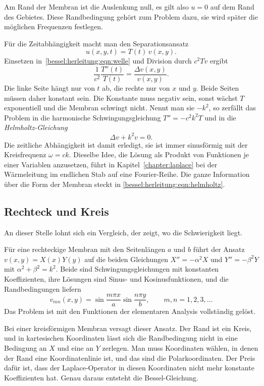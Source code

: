 Am Rand der Membran ist die Auslenkung null, es gilt also $u=0$ auf dem Rand des Gebietes.
Diese Randbedingung gehört zum Problem dazu, sie wird später die möglichen Frequenzen festlegen.

Für die Zeitabhängigkeit macht man den Separationsansatz
%
\begin{equation}
u(x,y,t)
=
T(t)\, v(x,y).
\label{bessel:herleitung:eqn:zeitsep}
\end{equation}
Einsetzen in~\eqref{bessel:herleitung:eqn:welle} und Division durch
$c^2Tv$ ergibt
\[
\frac{1}{c^2}\frac{T''(t)}{T(t)}
=
\frac{\Delta v(x,y)}{v(x,y)}.
\]
Die linke Seite hängt nur von $t$ ab, die rechte nur von $x$ und $y$.
Beide Seiten müssen daher konstant sein.
Die Konstante muss negativ sein, sonst wächst $T$ exponentiell und die Membran schwingt nicht.
Nennt man sie $-k^2$, so zerfällt das Problem in die harmonische Schwingungsgleichung $T''=-c^2k^2T$ und in die
\emph{Helmholtz-Gleichung}
%
\begin{equation}
\Delta v + k^2 v = 0.
\label{bessel:herleitung:eqn:helmholtz}
\end{equation}
Die zeitliche Abhängigkeit ist damit erledigt, sie ist immer sinusförmig mit der Kreisfrequenz $\omega = ck$.
Dieselbe Idee, die Lösung als Produkt von Funktionen je einer Variablen anzusetzen, führt in Kapitel~\ref{chapter:laplace} bei der Wärmeleitung im endlichen Stab auf eine Fourier-Reihe.
Die ganze Information über die Form der Membran steckt in
\eqref{bessel:herleitung:eqn:helmholtz}.
%
%
\subsection{Rechteck und Kreis
\label{bessel:herleitung:subsection:rechteckkreis}}
An dieser Stelle lohnt sich ein Vergleich, der zeigt, wo die Schwierigkeit liegt.

Für eine rechteckige Membran mit den Seitenlängen $a$ und $b$ führt der Ansatz $v(x,y)=X(x)Y(y)$ auf die beiden Gleichungen
$X''=-\alpha^2X$ und $Y''=-\beta^2Y$ mit $\alpha^2+\beta^2=k^2$.
Beide sind Schwingungsgleichungen mit konstanten Koeffizienten, ihre Lösungen sind Sinus- und Kosinusfunktionen, und die Randbedingungen liefern
\[
v_{mn}(x,y)
=
\sin\frac{m\pi x}{a}
\sin\frac{n\pi y}{b},
\qquad
m,n = 1,2,3,\dots
\]
Das Problem ist mit den Funktionen der elementaren Analysis vollständig gelöst.

Bei einer kreisförmigen Membran versagt dieser Ansatz.
Der Rand ist ein Kreis, und in kartesischen Koordinaten lässt sich die Randbedingung nicht in eine Bedingung an $X$ und eine an $Y$ zerlegen.
Man muss Koordinaten wählen, in denen der Rand eine Koordinatenlinie ist, und das sind die Polarkoordinaten.
Der Preis dafür ist, dass der Laplace-Operator in diesen Koordinaten nicht mehr konstante Koeffizienten hat.
Genau daraus entsteht die Bessel-Gleichung.
%
%
